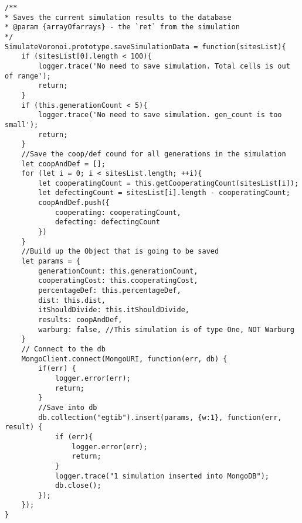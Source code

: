 \begin{lstlisting}[caption={Szimulációs adatok lementése az adatbázisba}, label={saveMongoBD}]
/**
* Saves the current simulation results to the database
* @param {arrayOfarrays} - the `ret` from the simulation
*/
SimulateVoronoi.prototype.saveSimulationData = function(sitesList){
	if (sitesList[0].length < 100){
		logger.trace('No need to save simulation. Total cells is out of range');
		return;
	}
	if (this.generationCount < 5){
		logger.trace('No need to save simulation. gen_count is too small');
		return; 
	}
	//Save the coop/def cound for all generations in the simulation
	let coopAndDef = [];
	for (let i = 0; i < sitesList.length; ++i){
		let cooperatingCount = this.getCooperatingCount(sitesList[i]);
		let defectingCount = sitesList[i].length - cooperatingCount;
		coopAndDef.push({
			cooperating: cooperatingCount,
			defecting: defectingCount
		})
	}
	//Build up the Object that is going to be saved
	let params = {
		generationCount: this.generationCount,
		cooperatingCost: this.cooperatingCost,
		percentageDef: this.percentageDef,
		dist: this.dist,
		itShouldDivide: this.itShouldDivide,
		results: coopAndDef,
		warburg: false, //This simulation is of type One, NOT Warburg
	}
	// Connect to the db
	MongoClient.connect(MongoURI, function(err, db) {
		if(err) {
			logger.error(err); 
			return;
		}
		//Save into db
		db.collection("egtib").insert(params, {w:1}, function(err, result) {
			if (err){
				logger.error(err);
				return;
			}
			logger.trace("1 simulation inserted into MongoDB");
			db.close();
		});
	});
}
\end{lstlisting}

